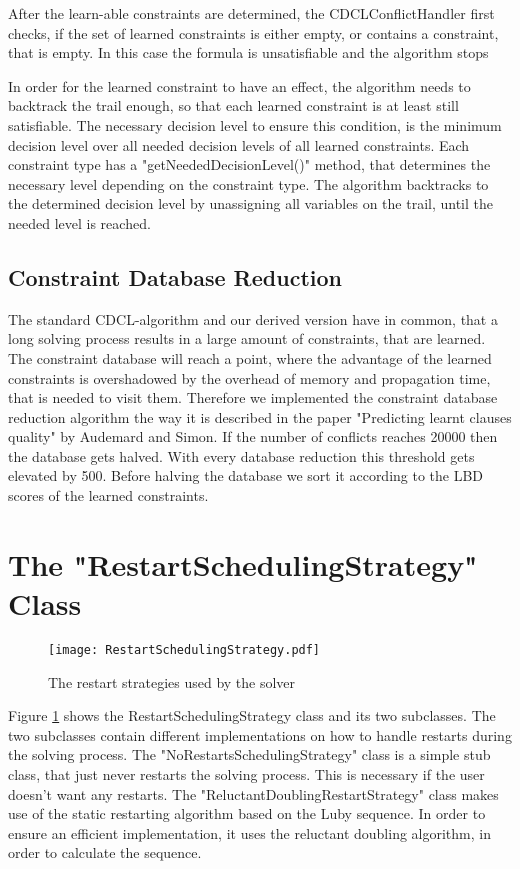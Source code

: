After the learn-able constraints are determined, the CDCLConflictHandler first checks, if the set of learned constraints is either empty, or contains a constraint, that is empty. In this case the formula is unsatisfiable and the algorithm stops
\par
In order for the learned constraint to have an effect, the algorithm needs to backtrack the trail enough, so that each learned constraint is at least still satisfiable. The necessary decision level to ensure this condition, is the minimum decision level over all needed decision levels of all learned constraints. Each constraint type has a "getNeededDecisionLevel()" method, that determines the necessary level depending on the constraint type. The algorithm backtracks to the determined decision level by unassigning all variables on the trail, until the needed level is reached.

\subsection{Constraint Database Reduction}

The standard CDCL-algorithm and our derived version have in common, that a long solving process results in a large amount of constraints, that are learned. The constraint database will reach a point, where the advantage of the learned constraints is overshadowed by the overhead of memory and propagation time, that is needed to visit them. Therefore we implemented the constraint database reduction algorithm the way it is described in the paper "Predicting learnt clauses quality" \cite{audemard2009predicting} by Audemard and Simon. If the number of conflicts reaches 20000 then the database gets halved. With every database reduction this threshold gets elevated by 500. Before halving the database we sort it according to the LBD scores of the learned constraints.

\section{The "RestartSchedulingStrategy" Class}

\begin{figure}[htbp]
  \centering
  \texttt{[image: RestartSchedulingStrategy.pdf]}	
  \caption{The restart strategies used by the solver}
  \label{fig:restartScheduling}
\end{figure}


Figure \ref{fig:restartScheduling} shows the RestartSchedulingStrategy class and its two subclasses. The two subclasses contain different implementations on how to handle restarts during the solving process. The "NoRestartsSchedulingStrategy" class is a simple stub class, that just never restarts the solving process. This is necessary if the user doesn't want any restarts. The "ReluctantDoublingRestartStrategy" class makes use of the static restarting algorithm based on the Luby sequence. In order to ensure an efficient implementation, it uses the reluctant doubling algorithm, in order to calculate the sequence.

